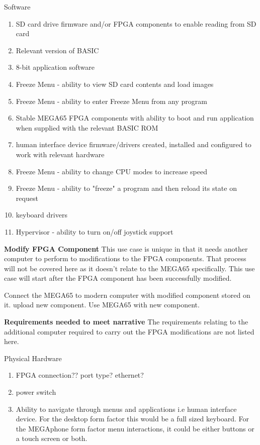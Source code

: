 Software
\begin{enumerate}
\item SD card drive firmware and/or FPGA components to enable reading from SD card
\item Relevant version of BASIC 
\item 8-bit application software
\item Freeze Menu - ability to view SD card contents and load images
\item Freeze Menu - ability to enter Freeze Menu from any program
\item Stable MEGA65 FPGA components with ability to boot and run application when supplied with the relevant BASIC ROM
\item human interface device firmware/drivers created, installed and configured to work with relevant hardware
\item Freeze Menu - ability to change CPU modes to increase speed
\item Freeze Menu - ability to "freeze" a program and then reload its state on request
\item keyboard drivers
\item Hypervisor - ability to turn on/off joystick support
\end{enumerate}

\textbf{Modify FPGA Component}
This use case is unique in that it needs another computer to perform to modifications to the FPGA components. That process will not be covered here as it doesn't relate to the MEGA65 specifically. This use case will start after the FPGA component has been successfully modified. 

Connect the MEGA65 to modern computer with modified component stored on it. 
upload new component.
Use MEGA65 with new component.

\textbf{Requirements needed to meet narrative}
The requirements relating to the additional computer required to carry out the FPGA modifications are not listed here.

Physical Hardware
\begin{enumerate}
\item FPGA connection?? port type? ethernet?
\item power switch
\item Ability to navigate through menus and applications i.e human interface device. For the desktop form factor this would be a full sized keyboard. For the MEGAphone form factor menu interactions, it could be either buttons or a touch screen or both.
\end{enumerate}

